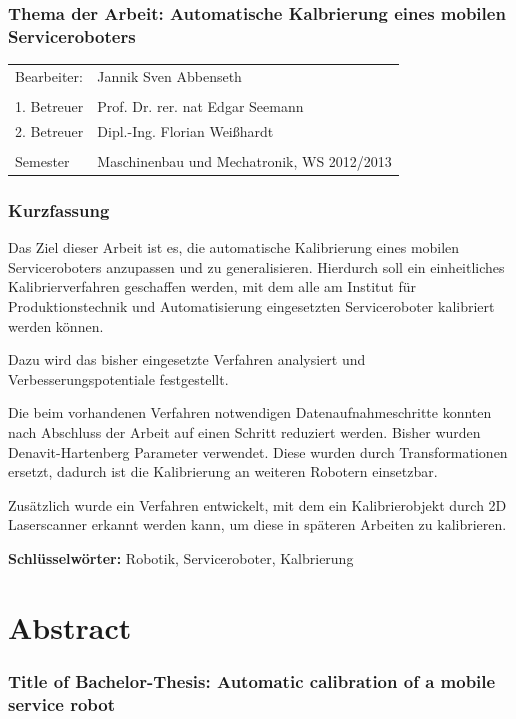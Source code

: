 \subsubsection*{Thema der Arbeit: Automatische Kalbrierung eines mobilen Serviceroboters}


\begin{tabular}{ll}

  Bearbeiter:&Jannik Sven Abbenseth\\\\
  1. Betreuer&Prof. Dr. rer. nat Edgar Seemann\\
  2. Betreuer&Dipl.-Ing. Florian Weißhardt \\\\
  Semester& Maschinenbau und Mechatronik, WS 2012/2013
\end{tabular}
\subsubsection{Kurzfassung}
\label{ssub:Kurzfassung}
Das Ziel dieser Arbeit ist es, die automatische Kalibrierung eines mobilen 
Serviceroboters anzupassen und zu generalisieren.
Hierdurch soll ein einheitliches Kalibrierverfahren 
geschaffen werden, mit dem alle am Institut für Produktionstechnik
und Automatisierung
eingesetzten Serviceroboter kalibriert werden können.

Dazu wird das bisher eingesetzte Verfahren analysiert und 
Verbesserungspotentiale festgestellt.

Die beim vorhandenen Verfahren notwendigen Datenaufnahmeschritte konnten nach Abschluss der 
Arbeit auf einen Schritt reduziert werden. Bisher wurden Denavit-Hartenberg 
Parameter verwendet. Diese wurden durch Transformationen ersetzt, dadurch ist die 
Kalibrierung an weiteren Robotern einsetzbar.

Zusätzlich wurde ein Verfahren entwickelt, mit dem ein Kalibrierobjekt durch 2D
Laserscanner erkannt werden kann, um diese in späteren Arbeiten zu kalibrieren.

\vfill
\textbf{Schlüsselwörter: }Robotik, Serviceroboter, Kalbrierung


\section*{Abstract\phantom{g}}
\subsubsection*{Title of Bachelor-Thesis: Automatic calibration of a mobile 
  service robot\phantom{g}}


